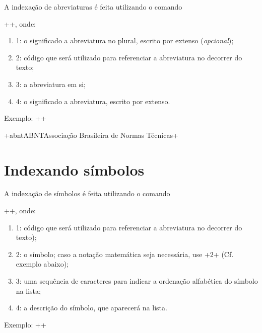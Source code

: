 \documentclass{fei}
\begin{document}
	A indexação de abreviaturas é feita utilizando o comando
	
	\latexinline++, onde:
	
	\begin{enumerate}
	\item 1: o significado a abreviatura no plural, escrito por extenso (\emph{opcional});
	\item 2: código que será utilizado para referenciar a abreviatura no decorrer do texto;
	\item 3: a abreviatura em si;
	\item 4: o significado a abreviatura, escrito por extenso.
	\end{enumerate}
	
	Exemplo: \latexinline+\newacronym[longplural=Associações+
	
			 \latexinline+Brasileiras de Normas Técnicas]+
			 
			 \latexinline+{abnt}{ABNT}{Associação Brasileira de Normas Técnicas}+
			 
	\section{Indexando símbolos}
	
	A indexação de símbolos é feita utilizando o comando
	
	\latexinline++, onde:
	
	\begin{enumerate}
	\item 1: código que será utilizado para referenciar a abreviatura no decorrer do texto);
	\item 2: o símbolo; caso a notação matemática seja necessária, use \latexinline+\ensuremath{2}+ (Cf. exemplo abaixo);
	\item 3: uma sequência de caracteres para indicar a ordenação alfabética do símbolo na lista;
	\item 4: a descrição do símbolo, que aparecerá na lista.
	\end{enumerate}
	
	Exemplo: \latexinline++
\end{document}
